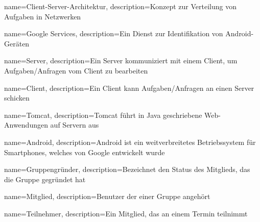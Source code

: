 	{
	name=Client-Server-Architektur,
	description={Konzept zur Verteilung von Aufgaben in Netzwerken}
	}
	
	{
		name=Google Services,
		description={Ein Dienst zur Identifikation von Android-Geräten}
	}
	
	
	{
	name=Server,
	description={Ein Server kommuniziert mit einem Client, um Aufgaben/Anfragen vom Client zu bearbeiten}
	}
	
	{
	name=Client,
	description={Ein Client kann Aufgaben/Anfragen an einen Server schicken}
	}	
	
	{
	name=Tomcat,
	description={Tomcat führt in Java geschriebene Web-Anwendungen auf Servern aus}
	}	
	
	{
	name=Android,
	description={Android ist ein weitverbreitetes Betriebssystem für Smartphones, welches von Google entwickelt wurde}
	}	
	
	{
	name=Gruppengründer,
	description={Bezeichnet den Status des Mitglieds, das die Gruppe gegründet hat}
	}
	
	{
	name=Mitglied,
	description={Benutzer der einer Gruppe angehört}
	}
	
	{
	name=Teilnehmer,
	description={Ein Mitglied, das an einem Termin teilnimmt}
	}